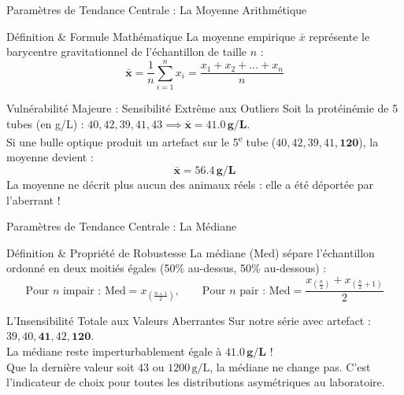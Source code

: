 \documentclass[aspectratio=169,10pt]{beamer}
\begin{document}
\begin{frame}{Paramètres de Tendance Centrale : La Moyenne Arithmétique}
  \begin{conceptbox}{Définition \& Formule Mathématique}
    La moyenne empirique $\bar{x}$ représente le barycentre gravitationnel de l'échantillon de taille $n$ :
    \begin{equation*}
      \mathbf{\bar{x}} = \frac{1}{n} \sum_{i=1}^n x_i = \frac{x_1 + x_2 + \dots + x_n}{n}
    \end{equation*}
  \end{conceptbox}
  \vspace{1.5mm}
  \begin{warnbox}{Vulnérabilité Majeure : Sensibilité Extrême aux Outliers}
    Soit la protéinémie de 5 tubes (en g/L) : $40, 42, 39, 41, 43 \implies \mathbf{\bar{x} = 41.0\,\text{g/L}}$.\\
    Si une bulle optique produit un artefact sur le 5\textsuperscript{e} tube ($40, 42, 39, 41, \mathbf{120}$), la moyenne devient :
    \begin{equation*}
      \mathbf{\bar{x} = 56.4\,\text{g/L}}
    \end{equation*}
    La moyenne ne décrit plus aucun des animaux réels : elle a été déportée par l'aberrant !
  \end{warnbox}
\end{frame}

\begin{frame}{Paramètres de Tendance Centrale : La Médiane}
  \begin{conceptbox}{Définition \& Propriété de Robustesse}
    La médiane ($\text{Med}$) sépare l'échantillon ordonné en deux moitiés égales (50\% au-dessus, 50\% au-dessous) :
    \begin{equation*}
      \text{Pour } n \text{ impair : } \text{Med} = x_{\left(\frac{n+1}{2}\right)}, \qquad \text{Pour } n \text{ pair : } \text{Med} = \frac{x_{\left(\frac{n}{2}\right)} + x_{\left(\frac{n}{2}+1\right)}}{2}
    \end{equation*}
  \end{conceptbox}
  \vspace{1.5mm}
  \begin{biobox}{L'Insensibilité Totale aux Valeurs Aberrantes}
    Sur notre série avec artefact : $39, 40, \mathbf{41}, 42, \mathbf{120}$.\\
    La médiane reste imperturbablement égale à $\mathbf{41.0\,\text{g/L}}$ !\\
    Que la dernière valeur soit $43$ ou $1200\,\text{g/L}$, la médiane ne change pas. C'est l'indicateur de choix pour toutes les distributions asymétriques au laboratoire.
  \end{biobox}
\end{frame}
\end{document}
